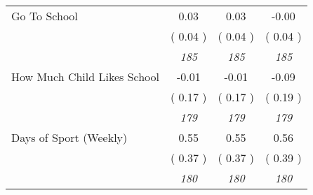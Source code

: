 \begin{tabular}{l c c c}
Go To School &      0.03 &      0.03 &     -0.00 \\
& (     0.04 ) & (     0.04 ) & (     0.04 ) \\
& \textit{ 185 } & \textit{ 185 } & \textit{ 185 } \\
How Much Child Likes School &     -0.01 &     -0.01 &     -0.09 \\
& (     0.17 ) & (     0.17 ) & (     0.19 ) \\
& \textit{ 179 } & \textit{ 179 } & \textit{ 179 } \\
Days of Sport (Weekly) &      0.55 &      0.55 &      0.56 \\
& (     0.37 ) & (     0.37 ) & (     0.39 ) \\
& \textit{ 180 } & \textit{ 180 } & \textit{ 180 } \\
\bottomrule
\end{tabular}
